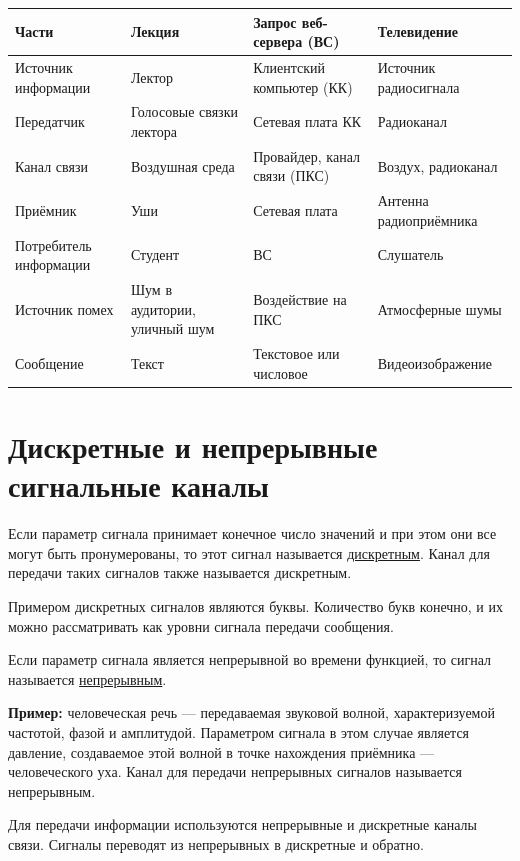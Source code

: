 \documentclass[a4paper, 12pt]{article}
\begin{document}
\begin{center}
\begin{tabularx}{\textwidth}{|X|X|X|X|}
\hline
\textbf{Части} & \textbf{Лекция} & \textbf{Запрос веб-сервера (ВС)} & \textbf{Телевидение} \\
\hline
Источник информации & Лектор & Клиентский компьютер (КК) & Источник радиосигнала \\
\hline
Передатчик & Голосовые связки лектора & Сетевая плата КК & Радиоканал \\
\hline
Канал связи & Воздушная среда & Провайдер, канал связи (ПКС) & Воздух, радиоканал \\
\hline
Приёмник & Уши & Сетевая плата & Антенна радиоприёмника \\
\hline
Потребитель информации & Студент & ВС & Слушатель \\
\hline
Источник помех & Шум в аудитории, уличный шум & Воздействие на ПКС & Атмосферные шумы \\
\hline
Сообщение & Текст & Текстовое или числовое & Видеоизображение \\
\hline
\end{tabularx}
\end{center}

\section*{Дискретные и непрерывные сигнальные каналы}

Если параметр сигнала принимает конечное число значений и при этом они все
могут быть пронумерованы, то этот сигнал называется \underline{дискретным}.
Канал для передачи таких сигналов также называется дискретным.

Примером дискретных сигналов являются буквы. Количество букв конечно, и их
можно рассматривать как уровни сигнала передачи сообщения.

Если параметр сигнала является непрерывной во времени функцией, то сигнал
называется \underline{непрерывным}.

\textbf{Пример:} человеческая речь --- передаваемая звуковой волной,
характеризуемой частотой, фазой и амплитудой. Параметром сигнала в этом
случае является давление, создаваемое этой волной в точке нахождения
приёмника --- человеческого уха. Канал для передачи непрерывных сигналов
называется непрерывным.

Для передачи информации используются непрерывные и дискретные каналы связи.
Сигналы переводят из непрерывных в дискретные и обратно.
\end{document}
